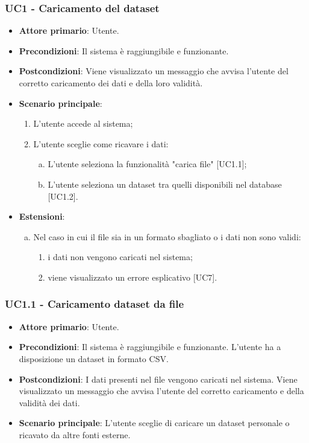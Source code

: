 \subsubsection{UC1 - Caricamento del dataset}

\begin{itemize}
	\item \textbf{Attore primario}: Utente.
	\item \textbf{Precondizioni}: Il sistema è raggiungibile e funzionante.
	\item \textbf{Postcondizioni}: Viene visualizzato un messaggio che avvisa l'utente del corretto caricamento dei dati e della loro validità.
	\item \textbf{Scenario principale}:
		\begin{enumerate}
			\item L'utente accede al sistema;
			\item L'utente sceglie come ricavare i dati:
				\begin{enumerate}[(a)]
			\item L'utente seleziona la funzionalità "carica file" [UC1.1];
			\item L'utente seleziona un dataset tra quelli disponibili nel database [UC1.2].
				\end{enumerate}
		\end{enumerate}
	\item \textbf{Estensioni}:
	\begin{enumerate}[(a)]
		\item Nel caso in cui il file sia in un formato sbagliato o i dati non sono validi:
		\begin{enumerate}[1.]
			\item i dati non vengono caricati nel sistema;
			\item viene visualizzato un errore esplicativo [UC7].
		\end{enumerate}
	\end{enumerate}
\end{itemize}

\subsubsection{UC1.1 - Caricamento dataset da file}

\begin{itemize}
	\item \textbf{Attore primario}: Utente.
	\item \textbf{Precondizioni}: Il sistema è raggiungibile e funzionante. L'utente ha a disposizione un dataset in formato CSV.
	\item \textbf{Postcondizioni}: I dati presenti nel file vengono caricati nel sistema. Viene visualizzato un messaggio che avvisa l'utente del corretto caricamento e della validità dei dati.
	\item \textbf{Scenario principale}: L'utente sceglie di caricare un dataset personale o ricavato da altre fonti esterne.
	
\end{itemize}

